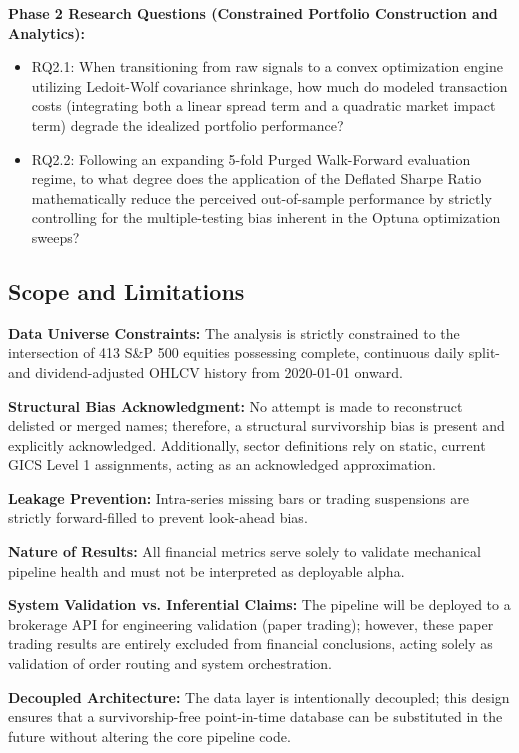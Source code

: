 \documentclass[twoside,final]{hcmut-report}
\begin{document}
\textbf{Phase 2 Research Questions (Constrained Portfolio Construction and Analytics):}
\begin{itemize}
    \item RQ2.1: When transitioning from raw signals to a convex optimization engine utilizing Ledoit-Wolf covariance shrinkage, how much do modeled transaction costs (integrating both a linear spread term and a quadratic market impact term) degrade the idealized portfolio performance?
    \item RQ2.2: Following an expanding 5-fold Purged Walk-Forward evaluation regime, to what degree does the application of the Deflated Sharpe Ratio mathematically reduce the perceived out-of-sample performance by strictly controlling for the multiple-testing bias inherent in the Optuna optimization sweeps?
\end{itemize}

\subsection{Scope and Limitations}

\textbf{Data Universe Constraints:} The analysis is strictly constrained to the intersection of 413 S\&P 500 equities possessing complete, continuous daily split- and dividend-adjusted OHLCV history from 2020-01-01 onward.

\textbf{Structural Bias Acknowledgment:} No attempt is made to reconstruct delisted or merged names; therefore, a structural survivorship bias is present and explicitly acknowledged. Additionally, sector definitions rely on static, current GICS Level 1 assignments, acting as an acknowledged approximation.

\textbf{Leakage Prevention:} Intra-series missing bars or trading suspensions are strictly forward-filled to prevent look-ahead bias.

\textbf{Nature of Results:} All financial metrics serve solely to validate mechanical pipeline health and must not be interpreted as deployable alpha.

\textbf{System Validation vs. Inferential Claims:} The pipeline will be deployed to a brokerage API for engineering validation (paper trading); however, these paper trading results are entirely excluded from financial conclusions, acting solely as validation of order routing and system orchestration.

\textbf{Decoupled Architecture:} The data layer is intentionally decoupled; this design ensures that a survivorship-free point-in-time database can be substituted in the future without altering the core pipeline code.
\end{document}
